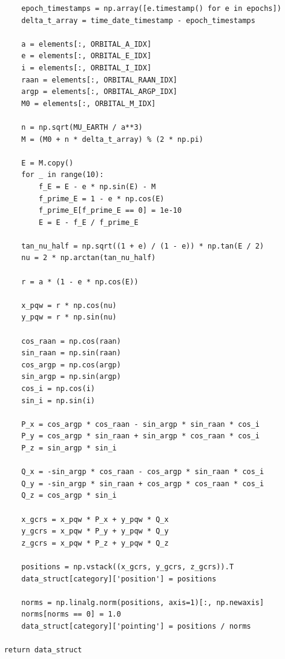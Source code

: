 \documentclass[11pt]{article}
\begin{document}
\begin{Verbatim}
        epoch_timestamps = np.array([e.timestamp() for e in epochs])
        delta_t_array = time_date_timestamp - epoch_timestamps

        a = elements[:, ORBITAL_A_IDX]
        e = elements[:, ORBITAL_E_IDX]
        i = elements[:, ORBITAL_I_IDX]
        raan = elements[:, ORBITAL_RAAN_IDX]
        argp = elements[:, ORBITAL_ARGP_IDX]
        M0 = elements[:, ORBITAL_M_IDX]

        n = np.sqrt(MU_EARTH / a**3)
        M = (M0 + n * delta_t_array) % (2 * np.pi)

        E = M.copy()
        for _ in range(10):
            f_E = E - e * np.sin(E) - M
            f_prime_E = 1 - e * np.cos(E)
            f_prime_E[f_prime_E == 0] = 1e-10
            E = E - f_E / f_prime_E

        tan_nu_half = np.sqrt((1 + e) / (1 - e)) * np.tan(E / 2)
        nu = 2 * np.arctan(tan_nu_half)

        r = a * (1 - e * np.cos(E))

        x_pqw = r * np.cos(nu)
        y_pqw = r * np.sin(nu)

        cos_raan = np.cos(raan)
        sin_raan = np.sin(raan)
        cos_argp = np.cos(argp)
        sin_argp = np.sin(argp)
        cos_i = np.cos(i)
        sin_i = np.sin(i)

        P_x = cos_argp * cos_raan - sin_argp * sin_raan * cos_i
        P_y = cos_argp * sin_raan + sin_argp * cos_raan * cos_i
        P_z = sin_argp * sin_i

        Q_x = -sin_argp * cos_raan - cos_argp * sin_raan * cos_i
        Q_y = -sin_argp * sin_raan + cos_argp * cos_raan * cos_i
        Q_z = cos_argp * sin_i

        x_gcrs = x_pqw * P_x + y_pqw * Q_x
        y_gcrs = x_pqw * P_y + y_pqw * Q_y
        z_gcrs = x_pqw * P_z + y_pqw * Q_z

        positions = np.vstack((x_gcrs, y_gcrs, z_gcrs)).T
        data_struct[category]['position'] = positions

        norms = np.linalg.norm(positions, axis=1)[:, np.newaxis]
        norms[norms == 0] = 1.0
        data_struct[category]['pointing'] = positions / norms

    return data_struct
\end{Verbatim}
\end{document}
